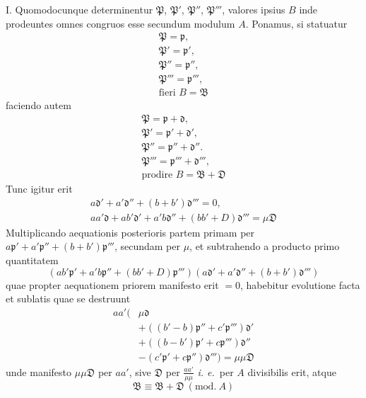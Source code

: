 I. Quomodocunque determinentur $\mathfrak{P}$, $\mathfrak{P}'$, $\mathfrak{P}''$, $\mathfrak{P}'''$, valores ipsius $B$ inde prodeuntes omnes congruos esse secundum modulum $A$. Ponamus, si statuatur
\[
\begin{gathered}\mathfrak{P}=\mathfrak{p},\\ \mathfrak{P}'=\mathfrak{p}',\\ \mathfrak{P}''=\mathfrak{p}'',\\ \mathfrak{P}'''=\mathfrak{p}''',\\\text{fieri } B=\mathfrak{B}\end{gathered}
\]
faciendo autem
\[
\begin{gathered}\mathfrak{P}=\mathfrak{p}+\mathfrak{d},\\ \mathfrak{P}'=\mathfrak{p}'+\mathfrak{d}',\\ \mathfrak{P}''=\mathfrak{p}''+\mathfrak{d}''.\\ \mathfrak{P}'''=\mathfrak{p}'''+\mathfrak{d}''',\\\text{prodire } B=\mathfrak{B}+\mathfrak{D}\end{gathered}
\]
Tunc igitur erit
\[
\begin{gathered}a\mathfrak{d}'+a'\mathfrak{d}''+(b+b')\mathfrak{d}'''=0,\\
aa'\mathfrak{d}+ab'\mathfrak{d}'+a'b\mathfrak{d}''+(bb'+D)\mathfrak{d}'''=\mu\mathfrak{D}\end{gathered}
\]
Multiplicando aequationis posterioris partem primam per $a\mathfrak{p}'+a'\mathfrak{p}''+(b+b')\mathfrak{p}'''$, secundam per $\mu$, et subtrahendo a producto primo quantitatem
\[
(ab'\mathfrak{p}'+a'b\mathfrak{p}''+(bb'+D)\mathfrak{p}''')(a\mathfrak{d}'+a'\mathfrak{d}''+(b+b')\mathfrak{d}''')
\]
quae propter aequationem priorem manifesto erit $=0$, habebitur evolutione facta et sublatis quae se destruunt
\[
\begin{aligned}aa'(&\mu\mathfrak{d}\\&+((b'-b)\mathfrak{p}''+c'\mathfrak{p}''')\mathfrak{d}'\\&+((b-b')\mathfrak{p}'+c\mathfrak{p}''')\mathfrak{d}''\\&-(c'\mathfrak{p}'+c\mathfrak{p}'')\mathfrak{d}''')=\mu\mu\mathfrak{D}\end{aligned}
\]
unde manifesto $\mu\mu\mathfrak{D}$ per $aa'$, sive $\mathfrak{D}$ per $\frac{aa'}{\mu\mu}$ \textit{i. e.}\ per $A$ divisibilis erit, atque
\[
\mathfrak{B}\equiv\mathfrak{B}+\mathfrak{D}\ (\mathrm{mod.}\ A)
\]

